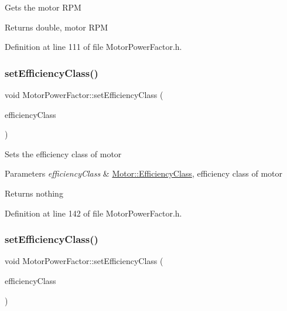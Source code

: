 Gets the motor R\+PM

\begin{DoxyReturn}{Returns}
double, motor R\+PM 
\end{DoxyReturn}


Definition at line 111 of file Motor\+Power\+Factor.\+h.

\mbox{\label{class_motor_power_factor_add3125243d7f11131abc4e1d172ffdfc}} 
\subsubsection{\texorpdfstring{set\+Efficiency\+Class()}{setEfficiencyClass()}\hspace{0.1cm}{\footnotesize\ttfamily [1/3]}}
{\footnotesize\ttfamily void Motor\+Power\+Factor\+::set\+Efficiency\+Class (\begin{DoxyParamCaption}\item[{\hyperlink{class_motor_afa022971ae062406a9f588c601673d4e}{Motor\+::\+Efficiency\+Class}}]{efficiency\+Class }\end{DoxyParamCaption})\hspace{0.3cm}{\ttfamily [inline]}}

Sets the efficiency class of motor


\begin{DoxyParams}{Parameters}
{\em efficiency\+Class} & \hyperlink{class_motor_afa022971ae062406a9f588c601673d4e}{Motor\+::\+Efficiency\+Class}, efficiency class of motor\\
\hline
\end{DoxyParams}
\begin{DoxyReturn}{Returns}
nothing 
\end{DoxyReturn}


Definition at line 142 of file Motor\+Power\+Factor.\+h.

\mbox{\label{class_motor_power_factor_add3125243d7f11131abc4e1d172ffdfc}} 
\subsubsection{\texorpdfstring{set\+Efficiency\+Class()}{setEfficiencyClass()}\hspace{0.1cm}{\footnotesize\ttfamily [2/3]}}
{\footnotesize\ttfamily void Motor\+Power\+Factor\+::set\+Efficiency\+Class (\begin{DoxyParamCaption}\item[{\hyperlink{class_motor_afa022971ae062406a9f588c601673d4e}{Motor\+::\+Efficiency\+Class}}]{efficiency\+Class }\end{DoxyParamCaption})\hspace{0.3cm}{\ttfamily [inline]}}

